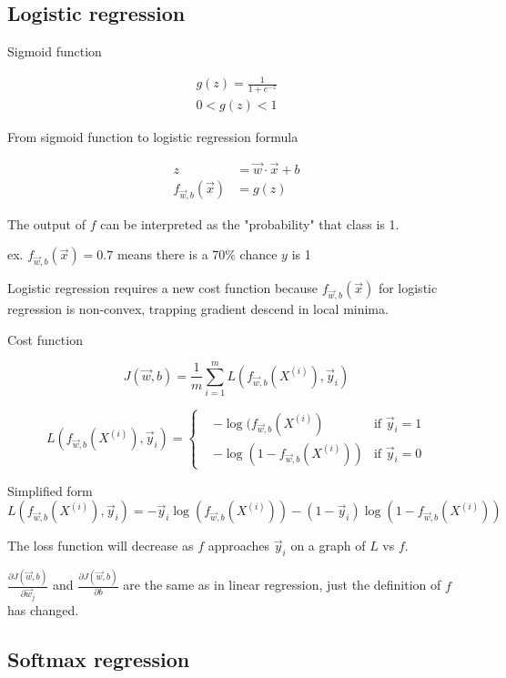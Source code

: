 \documentclass[12pt]{article}
\begin{document}
\subsection{Logistic regression}

Sigmoid function

\begin{gather*}
g(z) = \frac{1}{1 + e^{-z}}\\
0 < g(z) < 1
\end{gather*}

From sigmoid function to logistic regression formula

\begin{align*}
z &= \vec{w} \cdot \vec{x} + b\\
f_{\vec{w},b}(\vec{x}) &= g(z)
\end{align*}

The output of $f$ can be interpreted as the "probability" that class is 1.

ex. $f_{\vec{w},b}(\vec{x}) = 0.7$ means there is a 70\% chance $y$ is 1

Logistic regression requires a new cost function because $f_{\vec{w},b}(\vec{x})$ for logistic regression is non-convex, trapping gradient descend in local minima.

Cost function

\[ J(\vec{w},b) = \frac{1}{m} \sum_{i=1}^{m} L(f_{\vec{w},b}(X^{(i)}),\vec{y}_i) \]

\begin{equation*}
L(f_{\vec{w},b}(X^{(i)}),\vec{y}_i) = 
  \left\{
    \begin{aligned}
      & -\log(f_{\vec{w},b}(X^{(i)}) & \text{if } \vec{y}_i = 1 \\
      & -\log(1 - f_{\vec{w},b}(X^{(i)})) & \text{if } \vec{y}_i = 0
    \end{aligned}
  \right.
\end{equation*}

Simplified form
\[ L(f_{\vec{w},b}(X^{(i)}), \vec{y}_i) = -\vec{y}_i \log(f_{\vec{w},b}(X^{(i)})) - (1 - \vec{y}_i) \log (1 - f_{\vec{w},b}(X^{(i)})) \]

The loss function will decrease as $f$ approaches $\vec{y}_i$ on a graph of $L$ vs $f$.

$\frac{\partial J(\vec{w},b)}{\partial \vec{w}_j}$ and $\frac{\partial J(\vec{w},b)}{\partial b}$ are the same as in linear regression, just the definition of $f$ has changed.

\subsection{Softmax regression}
\end{document}
